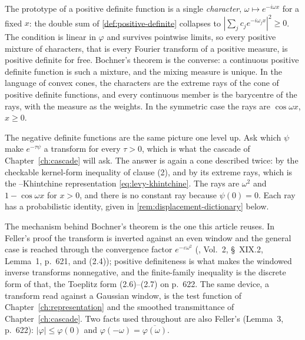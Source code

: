 \begin{remark}
\label{rem:pd-nd-intuition}
The prototype of a positive definite function is a single \emph{character},
$\omega \mapsto e^{-i\omega x}$ for a fixed $x$: the double sum of \ref{def:positive-definite}
collapses to $|\sum_j c_j e^{-i\omega_j x}|^2 \ge 0$. The condition is linear in $\varphi$ and
survives pointwise limits, so every positive mixture of characters, that is every Fourier
transform of a positive measure, is positive definite for free. Bochner's theorem is the
converse: a continuous positive definite function is such a mixture, and the mixing measure is
unique. In the language of convex cones, the characters are the extreme rays of the cone of
positive definite functions, and every continuous member is the barycentre of the rays, with
the measure as the weights. In the symmetric case the rays are $\cos\omega x$, $x \ge 0$.

The negative definite functions are the same picture one level up. Ask which $\psi$ make
$e^{-\tau\psi}$ a transform for every $\tau > 0$, which is what the cascade of
Chapter~\ref{ch:cascade} will ask. The answer is again a cone described twice: by the checkable
kernel-form inequality of clause (2), and by its extreme rays, which is the \Levy--Khintchine
representation \ref{eq:levy-khintchine}. The rays are $\omega^2$ and $1 - \cos\omega x$ for
$x > 0$, and there is no constant ray because $\psi(0) = 0$. Each ray has a probabilistic
identity, given in \ref{rem:displacement-dictionary} below.

The mechanism behind Bochner's theorem is the one this article reuses. In Feller's proof the
transform is inverted against an even window and the general case is reached through the
convergence factor $e^{-\varepsilon\omega^2}$ (, Vol.~2,
\S~XIX.2, Lemma~1, p.~621, and (2.4)); positive definiteness is what makes the windowed inverse
transforms nonnegative, and the finite-family inequality is the discrete form of that, the
Toeplitz form (2.6)--(2.7) on p.~622. The same device, a transform read against a Gaussian
window, is the test function of Chapter~\ref{ch:representation} and the smoothed transmittance
of Chapter~\ref{ch:cascade}. Two facts used throughout are also Feller's (Lemma~3, p.~622):
$|\varphi| \le \varphi(0)$ and $\varphi(-\omega) = \overline{\varphi(\omega)}$.


\end{remark}
